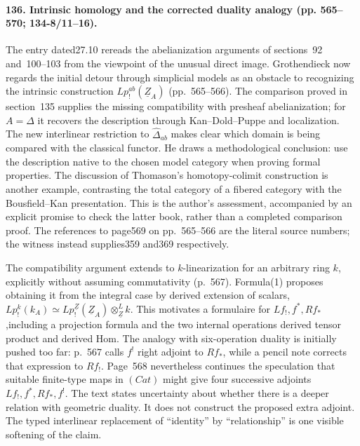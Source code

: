 \paragraph{136. Intrinsic homology and the corrected duality analogy (pp. 565--570; 134-8/11--16).}
The entry dated27.10 rereads the abelianization arguments of sections~92 and~100--103 from the viewpoint of the unusual direct image. Grothendieck now regards the initial detour through simplicial models as an obstacle to recognizing the intrinsic construction $Lp^{ab}_{!}(\underline Z_A)$ (pp.~565--566). The comparison proved in section~135 supplies the missing compatibility with presheaf abelianization; for $A=\Delta$ it recovers the description through Kan--Dold--Puppe and localization. The new interlinear restriction to $\widehat\Delta_{ab}$ makes clear which domain is being compared with the classical functor. He draws a methodological conclusion: use the description native to the chosen model category when proving formal properties. The discussion of Thomason's homotopy-colimit construction is another example, contrasting the total category of a fibered category with the Bousfield--Kan presentation. This is the author's assessment, accompanied by an explicit promise to check the latter book, rather than a completed comparison proof. The references to page569 on pp.~565--566 are the literal source numbers; the witness instead supplies359 and369 respectively.

The compatibility argument extends to $k$-linearization for an arbitrary ring $k$, explicitly without assuming commutativity (p.~567). Formula(1) proposes obtaining it from the integral case by derived extension of scalars, $Lp^k_{!}(k_A)\simeq Lp^{\underline Z}_{!}(\underline Z_A)\otimes^{L}_{\underline Z}k$. This motivates a formulaire for $Lf_{!},f^*,Rf_*$,including a projection formula and the two internal operations derived tensor product and derived Hom. The analogy with six-operation duality is initially pushed too far: p.~567 calls $f^!$ right adjoint to $Rf_*$, while a pencil note corrects that expression to $Rf_!$. Page~568 nevertheless continues the speculation that suitable finite-type maps in $(Cat)$ might give four successive adjoints $Lf_!,f^*,Rf_*,f^!$. The text states uncertainty about whether there is a deeper relation with geometric duality. It does not construct the proposed extra adjoint. The typed interlinear replacement of ``identity'' by ``relationship'' is one visible softening of the claim.


